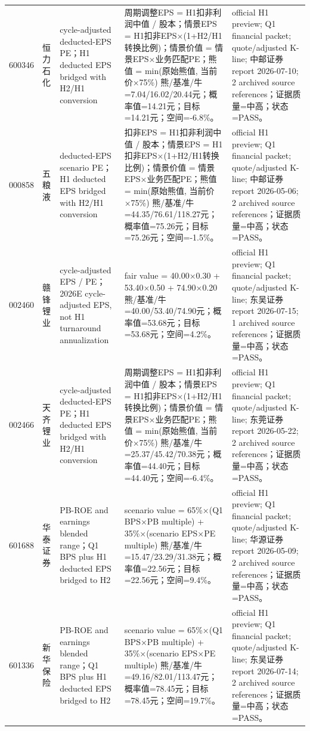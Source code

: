 \begin{longtable}{L{0.85cm}L{1.55cm}L{2.25cm}L{6.0cm}L{4.0cm}}
600346 & 恒力石化 & cycle-adjusted deducted-EPS PE；H1 deducted EPS bridged with H2/H1 conversion & 周期调整EPS = H1扣非利润中值 / 股本；情景EPS = H1扣非EPS×(1+H2/H1转换比例)；情景价值 = 情景EPS×业务匹配PE；熊值 = min(原始熊值, 当前价×75\%) 熊/基准/牛=7.04/16.02/20.44元；概率值=14.21元；目标=14.21元；空间=-6.8\%。 & official H1 preview; Q1 financial packet; quote/adjusted K-line; 中邮证券 report 2026-07-10; 2 archived source references；证据质量=中高；状态=PASS。 \\
000858 & 五粮液 & deducted-EPS scenario PE；H1 deducted EPS bridged with H2/H1 conversion & 扣非EPS = H1扣非利润中值 / 股本；情景EPS = H1扣非EPS×(1+H2/H1转换比例)；情景价值 = 情景EPS×业务匹配PE；熊值 = min(原始熊值, 当前价×75\%) 熊/基准/牛=44.35/76.61/118.27元；概率值=75.26元；目标=75.26元；空间=-1.5\%。 & official H1 preview; Q1 financial packet; quote/adjusted K-line; 中邮证券 report 2026-05-06; 2 archived source references；证据质量=中高；状态=PASS。 \\
002460 & 赣锋锂业 & cycle-adjusted EPS / PE；2026E cycle-adjusted EPS, not H1 turnaround annualization & fair value = 40.00×0.30 + 53.40×0.50 + 74.90×0.20 熊/基准/牛=40.00/53.40/74.90元；概率值=53.68元；目标=53.68元；空间=4.2\%。 & official H1 preview; Q1 financial packet; quote/adjusted K-line; 东吴证券 report 2026-07-15; 1 archived source references；证据质量=中高；状态=PASS。 \\
002466 & 天齐锂业 & cycle-adjusted deducted-EPS PE；H1 deducted EPS bridged with H2/H1 conversion & 周期调整EPS = H1扣非利润中值 / 股本；情景EPS = H1扣非EPS×(1+H2/H1转换比例)；情景价值 = 情景EPS×业务匹配PE；熊值 = min(原始熊值, 当前价×75\%) 熊/基准/牛=25.37/45.42/70.38元；概率值=44.40元；目标=44.40元；空间=-6.4\%。 & official H1 preview; Q1 financial packet; quote/adjusted K-line; 东莞证券 report 2026-05-22; 2 archived source references；证据质量=中高；状态=PASS。 \\
601688 & 华泰证券 & PB-ROE and earnings blended range；Q1 BPS plus H1 deducted EPS bridged to H2 & scenario value = 65\%×(Q1 BPS×PB multiple) + 35\%×(scenario EPS×PE multiple) 熊/基准/牛=15.47/23.29/31.38元；概率值=22.56元；目标=22.56元；空间=9.4\%。 & official H1 preview; Q1 financial packet; quote/adjusted K-line; 华源证券 report 2026-05-09; 2 archived source references；证据质量=中高；状态=PASS。 \\
601336 & 新华保险 & PB-ROE and earnings blended range；Q1 BPS plus H1 deducted EPS bridged to H2 & scenario value = 65\%×(Q1 BPS×PB multiple) + 35\%×(scenario EPS×PE multiple) 熊/基准/牛=49.16/82.01/113.47元；概率值=78.45元；目标=78.45元；空间=19.7\%。 & official H1 preview; Q1 financial packet; quote/adjusted K-line; 东吴证券 report 2026-07-14; 2 archived source references；证据质量=中高；状态=PASS。 \\

\end{longtable}

